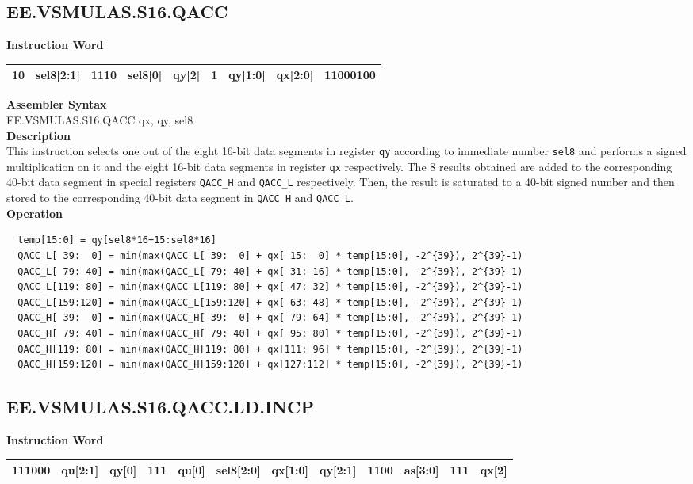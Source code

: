 \clearpage
\subsection{EE.VSMULAS.S16.QACC}\label{instruction:EEVSMULASS16QACC}
\setlength\tabcolsep{6pt}
\textbf{Instruction Word} \\
\begin{tabular}{|c|c|c|c|c|c|c|c|c|}
	\hline
	10 & sel8[2:1] & 1110 & sel8[0] & qy[2] & 1 & qy[1:0] & qx[2:0] & 11000100 \\
	\hline
\end{tabular}

\textbf{Assembler Syntax} \\
EE.VSMULAS.S16.QACC qx, qy, sel8 \\
\textbf{Description} \\
This instruction selects one out of the eight 16-bit data segments in register \lstinline{qy} according to immediate number \lstinline{sel8} and performs a signed multiplication on it and the eight 16-bit data segments in register \lstinline{qx} respectively. The 8 results obtained are added to the corresponding 40-bit data segment in special registers \lstinline{QACC_H} and \lstinline{QACC_L} respectively. Then, the result is saturated to a 40-bit signed number and then stored to the corresponding 40-bit data segment in \lstinline{QACC_H} and \lstinline{QACC_L}.\\
\textbf{Operation}
\begin{lstlisting}
  temp[15:0] = qy[sel8*16+15:sel8*16]
  QACC_L[ 39:  0] = min(max(QACC_L[ 39:  0] + qx[ 15:  0] * temp[15:0], -2^{39}), 2^{39}-1)
  QACC_L[ 79: 40] = min(max(QACC_L[ 79: 40] + qx[ 31: 16] * temp[15:0], -2^{39}), 2^{39}-1)
  QACC_L[119: 80] = min(max(QACC_L[119: 80] + qx[ 47: 32] * temp[15:0], -2^{39}), 2^{39}-1)
  QACC_L[159:120] = min(max(QACC_L[159:120] + qx[ 63: 48] * temp[15:0], -2^{39}), 2^{39}-1)
  QACC_H[ 39:  0] = min(max(QACC_H[ 39:  0] + qx[ 79: 64] * temp[15:0], -2^{39}), 2^{39}-1)
  QACC_H[ 79: 40] = min(max(QACC_H[ 79: 40] + qx[ 95: 80] * temp[15:0], -2^{39}), 2^{39}-1)
  QACC_H[119: 80] = min(max(QACC_H[119: 80] + qx[111: 96] * temp[15:0], -2^{39}), 2^{39}-1)
  QACC_H[159:120] = min(max(QACC_H[159:120] + qx[127:112] * temp[15:0], -2^{39}), 2^{39}-1)
\end{lstlisting}

\clearpage
\subsection{EE.VSMULAS.S16.QACC.LD.INCP}\label{instruction:EEVSMULASS16QACCLDINCP}
\setlength\tabcolsep{6pt}
\textbf{Instruction Word} \\
\begin{tabular}{|c|c|c|c|c|c|c|c|c|c|c|c|}
	\hline
	111000 & qu[2:1] & qy[0] & 111 & qu[0] & sel8[2:0] & qx[1:0] & qy[2:1] & 1100 & as[3:0] & 111 & qx[2] \\
	\hline
\end{tabular}

